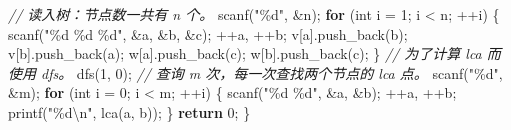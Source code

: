 \documentclass[
]{article}
\newenvironment{Shaded}{}{}
\newcommand{\CommentTok}[1]{\textcolor[rgb]{0.38,0.63,0.69}{\textit{#1}}}
\newcommand{\ControlFlowTok}[1]{\textcolor[rgb]{0.00,0.44,0.13}{\textbf{#1}}}
\newcommand{\DataTypeTok}[1]{\textcolor[rgb]{0.56,0.13,0.00}{#1}}
\newcommand{\DecValTok}[1]{\textcolor[rgb]{0.25,0.63,0.44}{#1}}
\newcommand{\NormalTok}[1]{#1}
\newcommand{\OperatorTok}[1]{\textcolor[rgb]{0.40,0.40,0.40}{#1}}
\newcommand{\SpecialCharTok}[1]{\textcolor[rgb]{0.25,0.44,0.63}{#1}}
\newcommand{\StringTok}[1]{\textcolor[rgb]{0.25,0.44,0.63}{#1}}
\begin{document}
\begin{Shaded}
\begin{Highlighting}[]
  \CommentTok{// 读入树：节点数一共有 n 个。}
\NormalTok{  scanf}\OperatorTok{(}\StringTok{"}\SpecialCharTok{\%d}\StringTok{"}\OperatorTok{,} \OperatorTok{\&}\NormalTok{n}\OperatorTok{);}
  \ControlFlowTok{for} \OperatorTok{(}\DataTypeTok{int}\NormalTok{ i }\OperatorTok{=} \DecValTok{1}\OperatorTok{;}\NormalTok{ i }\OperatorTok{\textless{}}\NormalTok{ n}\OperatorTok{;} \OperatorTok{++}\NormalTok{i}\OperatorTok{)} \OperatorTok{\{}
\NormalTok{    scanf}\OperatorTok{(}\StringTok{"}\SpecialCharTok{\%d}\StringTok{ }\SpecialCharTok{\%d}\StringTok{ }\SpecialCharTok{\%d}\StringTok{"}\OperatorTok{,} \OperatorTok{\&}\NormalTok{a}\OperatorTok{,} \OperatorTok{\&}\NormalTok{b}\OperatorTok{,} \OperatorTok{\&}\NormalTok{c}\OperatorTok{);}
    \OperatorTok{++}\NormalTok{a}\OperatorTok{,} \OperatorTok{++}\NormalTok{b}\OperatorTok{;}
\NormalTok{    v}\OperatorTok{[}\NormalTok{a}\OperatorTok{].}\NormalTok{push\_back}\OperatorTok{(}\NormalTok{b}\OperatorTok{);}
\NormalTok{    v}\OperatorTok{[}\NormalTok{b}\OperatorTok{].}\NormalTok{push\_back}\OperatorTok{(}\NormalTok{a}\OperatorTok{);}
\NormalTok{    w}\OperatorTok{[}\NormalTok{a}\OperatorTok{].}\NormalTok{push\_back}\OperatorTok{(}\NormalTok{c}\OperatorTok{);}
\NormalTok{    w}\OperatorTok{[}\NormalTok{b}\OperatorTok{].}\NormalTok{push\_back}\OperatorTok{(}\NormalTok{c}\OperatorTok{);}
  \OperatorTok{\}}
  \CommentTok{// 为了计算 lca 而使用 dfs。}
\NormalTok{  dfs}\OperatorTok{(}\DecValTok{1}\OperatorTok{,} \DecValTok{0}\OperatorTok{);}
  \CommentTok{// 查询 m 次，每一次查找两个节点的 lca 点。}
\NormalTok{  scanf}\OperatorTok{(}\StringTok{"}\SpecialCharTok{\%d}\StringTok{"}\OperatorTok{,} \OperatorTok{\&}\NormalTok{m}\OperatorTok{);}
  \ControlFlowTok{for} \OperatorTok{(}\DataTypeTok{int}\NormalTok{ i }\OperatorTok{=} \DecValTok{0}\OperatorTok{;}\NormalTok{ i }\OperatorTok{\textless{}}\NormalTok{ m}\OperatorTok{;} \OperatorTok{++}\NormalTok{i}\OperatorTok{)} \OperatorTok{\{}
\NormalTok{    scanf}\OperatorTok{(}\StringTok{"}\SpecialCharTok{\%d}\StringTok{ }\SpecialCharTok{\%d}\StringTok{"}\OperatorTok{,} \OperatorTok{\&}\NormalTok{a}\OperatorTok{,} \OperatorTok{\&}\NormalTok{b}\OperatorTok{);}
    \OperatorTok{++}\NormalTok{a}\OperatorTok{,} \OperatorTok{++}\NormalTok{b}\OperatorTok{;}
\NormalTok{    printf}\OperatorTok{(}\StringTok{"}\SpecialCharTok{\%d\textbackslash{}n}\StringTok{"}\OperatorTok{,}\NormalTok{ lca}\OperatorTok{(}\NormalTok{a}\OperatorTok{,}\NormalTok{ b}\OperatorTok{));}
  \OperatorTok{\}}
  \ControlFlowTok{return} \DecValTok{0}\OperatorTok{;}
\OperatorTok{\}}
\end{Highlighting}
\end{Shaded}
\end{document}
